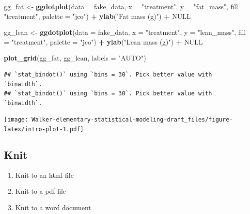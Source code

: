 \documentclass[]{book}
\newenvironment{Shaded}{\begin{snugshade}}{\end{snugshade}}
\newcommand{\DataTypeTok}[1]{\textcolor[rgb]{0.13,0.29,0.53}{#1}}
\newcommand{\KeywordTok}[1]{\textcolor[rgb]{0.13,0.29,0.53}{\textbf{#1}}}
\newcommand{\NormalTok}[1]{#1}
\newcommand{\OperatorTok}[1]{\textcolor[rgb]{0.81,0.36,0.00}{\textbf{#1}}}
\newcommand{\OtherTok}[1]{\textcolor[rgb]{0.56,0.35,0.01}{#1}}
\newcommand{\StringTok}[1]{\textcolor[rgb]{0.31,0.60,0.02}{#1}}
\providecommand{\tightlist}{%
  \setlength{\itemsep}{0pt}\setlength{\parskip}{0pt}}
\begin{document}
\begin{Shaded}
\begin{Highlighting}[]
\NormalTok{gg_fat <-}\StringTok{ }\KeywordTok{ggdotplot}\NormalTok{(}\DataTypeTok{data =}\NormalTok{ fake_data,}
                \DataTypeTok{x =} \StringTok{"treatment"}\NormalTok{,}
                \DataTypeTok{y =} \StringTok{"fat_mass"}\NormalTok{,}
                \DataTypeTok{fill =} \StringTok{"treatment"}\NormalTok{,}
                \DataTypeTok{palette =} \StringTok{"jco"}\NormalTok{) }\OperatorTok{+}
\StringTok{    }\KeywordTok{ylab}\NormalTok{(}\StringTok{"Fat mass (g)"}\NormalTok{) }\OperatorTok{+}
\StringTok{    }\OtherTok{NULL}

\NormalTok{gg_lean <-}\StringTok{ }\KeywordTok{ggdotplot}\NormalTok{(}\DataTypeTok{data =}\NormalTok{ fake_data,}
                \DataTypeTok{x =} \StringTok{"treatment"}\NormalTok{,}
                \DataTypeTok{y =} \StringTok{"lean_mass"}\NormalTok{,}
                \DataTypeTok{fill =} \StringTok{"treatment"}\NormalTok{,}
                \DataTypeTok{palette =} \StringTok{"jco"}\NormalTok{) }\OperatorTok{+}
\StringTok{    }\KeywordTok{ylab}\NormalTok{(}\StringTok{"Lean mass (g)"}\NormalTok{) }\OperatorTok{+}
\StringTok{    }\OtherTok{NULL}

\KeywordTok{plot_grid}\NormalTok{(gg_fat, gg_lean, }\DataTypeTok{labels =} \StringTok{"AUTO"}\NormalTok{)}
\end{Highlighting}
\end{Shaded}

\begin{verbatim}
## `stat_bindot()` using `bins = 30`. Pick better value with `binwidth`.
## `stat_bindot()` using `bins = 30`. Pick better value with `binwidth`.
\end{verbatim}

\texttt{[image: Walker-elementary-statistical-modeling-draft\_files/figure-latex/intro-plot-1.pdf]}

\hypertarget{knit}{%
\subsection{Knit}\label{knit}}

\begin{enumerate}
\def\labelenumi{\arabic{enumi}.}
\setcounter{enumi}{5}
\tightlist
\item
  Knit to an html file
\item
  Knit to a pdf file
\item
  Knit to a word document
\end{enumerate}
\end{document}
